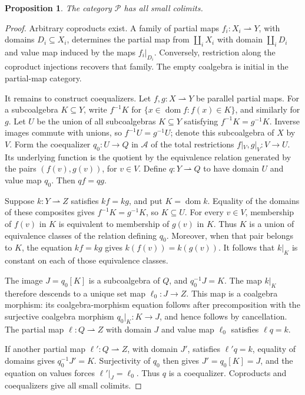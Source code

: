 \documentclass[11pt]{article}
\newtheorem{proposition}[theorem]{Proposition}
\newcommand{\dom}{\operatorname{dom}}\newcommand{\ran}{\operatorname{ran}}
\begin{document}
\begin{proposition}\label{prop:partial-coalgebra-colimits}
The category $\mathcal P$ has all small colimits.
\end{proposition}
\begin{proof}
Arbitrary coproducts exist. A family of partial maps $f_i:X_i\rightharpoonup Y$, with domains $D_i\subseteq X_i$, determines the partial map from $\coprod_iX_i$ with domain $\coprod_iD_i$ and value map induced by the maps $f_i|_{D_i}$. Conversely, restriction along the coproduct injections recovers that family. The empty coalgebra is initial in the partial-map category.

It remains to construct coequalizers. Let $f,g:X\rightharpoonup Y$ be parallel partial maps. For a subcoalgebra $K\subseteq Y$, write $f^{-1}K$ for $\{x\in\dom f:f(x)\in K\}$, and similarly for $g$. Let $U$ be the union of all subcoalgebras $K\subseteq Y$ satisfying $f^{-1}K=g^{-1}K$. Inverse images commute with unions, so $f^{-1}U=g^{-1}U$; denote this subcoalgebra of $X$ by $V$. Form the coequalizer $q_0:U\to Q$ in $\mathcal A$ of the total restrictions $f|_V,g|_V:V\to U$. Its underlying function is the quotient by the equivalence relation generated by the pairs $(f(v),g(v))$, for $v\in V$. Define $q:Y\rightharpoonup Q$ to have domain $U$ and value map $q_0$. Then $qf=qg$.

Suppose $k:Y\rightharpoonup Z$ satisfies $kf=kg$, and put $K=\dom k$. Equality of the domains of these composites gives $f^{-1}K=g^{-1}K$, so $K\subseteq U$. For every $v\in V$, membership of $f(v)$ in $K$ is equivalent to membership of $g(v)$ in $K$. Thus $K$ is a union of equivalence classes of the relation defining $q_0$. Moreover, when that pair belongs to $K$, the equation $kf=kg$ gives $k(f(v))=k(g(v))$. It follows that $k|_K$ is constant on each of those equivalence classes.

The image $J=q_0[K]$ is a subcoalgebra of $Q$, and $q_0^{-1}J=K$. The map $k|_K$ therefore descends to a unique set map $\ell_0:J\to Z$. This map is a coalgebra morphism: its coalgebra-morphism equation follows after precomposition with the surjective coalgebra morphism $q_0|_K:K\to J$, and hence follows by cancellation. The partial map $\ell:Q\rightharpoonup Z$ with domain $J$ and value map $\ell_0$ satisfies $\ell q=k$.

If another partial map $\ell':Q\rightharpoonup Z$, with domain $J'$, satisfies $\ell'q=k$, equality of domains gives $q_0^{-1}J'=K$. Surjectivity of $q_0$ then gives $J'=q_0[K]=J$, and the equation on values forces $\ell'|_J=\ell_0$. Thus $q$ is a coequalizer. Coproducts and coequalizers give all small colimits.
\end{proof}
\end{document}
